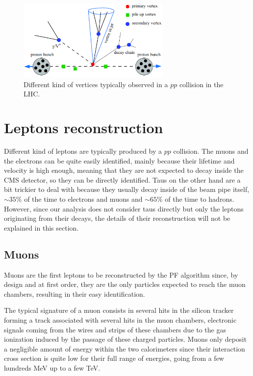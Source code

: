 \documentclass[a4paper, 10pt, openright]{report}
\begin{document}
\begin{figure}[htbp]
\begin{center}
\includegraphics[width=7.5cm, height=4cm]{figs/LHCPU.png}
\caption{Different kind of vertices typically observed in a $pp$ collision in the \ac{LHC}.}
\label{fig:LHCPU}
\end{center}
\end{figure}

\section{Leptons reconstruction} \label{section:RecoLep}

Different kind of leptons are typically produced by a $pp$ collision. The muons and the electrons can be quite easily identified, mainly because their lifetime and velocity is high enough, meaning that they are not expected to decay inside the \ac{CMS} detector, so they can be directly identified. Taus on the other hand are a bit trickier to deal with because they usually decay inside of the beam pipe itself, $\sim 35\%$ of the time to electrons and muons and $\sim 65\%$ of the time to hadrons. However, since our analysis does not consider taus directly but only the leptons originating from their decays, the details of their reconstruction will not be explained in this section.

\subsection{Muons} \label{subsection:Muons}

Muons are the first leptons to be reconstructed by the \ac{PF} algorithm since, by design and at first order, they are the only particles expected to reach the muon chambers, resulting in their easy identification. 

The typical signature of a muon consists in several hits in the silicon tracker forming a track associated with several hits in the muon chambers, electronic signals coming from the wires and strips of these chambers due to the gas ionization induced by the passage of these charged particles. Muons only deposit a negligible amount of energy within the two calorimeters since their interaction cross section is quite low for their full range of energies, going from a few hundreds MeV up to a few TeV.
\end{document}

